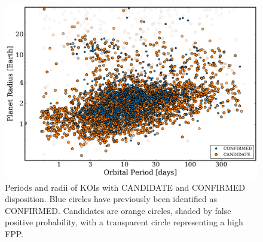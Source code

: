 \documentclass{emulateapj}
\newcommand{\figlabel}[1]{\label{fig:#1}}
\begin{document}
\begin{figure}[p]
\begin{center}
\includegraphics[width=7in]{figures/fppalpha.pdf}
\end{center}
\caption{Periods and radii of KOIs with CANDIDATE and CONFIRMED disposition.  
  Blue circles have previously been identified as CONFIRMED.  Candidates are orange circles, 
  shaded by false positive probability, with 
  a transparent circle representing a high FPP. 
  \figlabel{rpcand}}
\end{figure}





\begin{turnpage}

\end{turnpage}
\end{document}
